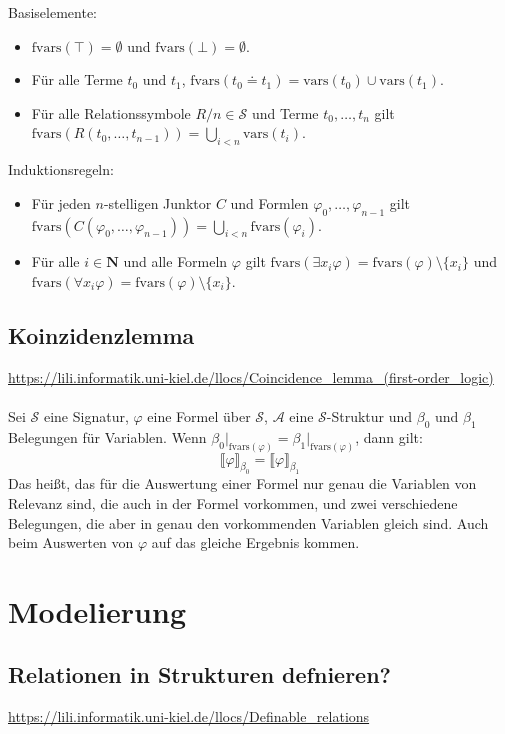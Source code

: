 \documentclass[twocolumn]{article}
\begin{document}
    Basiselemente:
    \begin{itemize}
        \item $\text{fvars}(\top) = \emptyset$ und $\text{fvars}(\bot) = \emptyset$.
        \item Für alle Terme $t_0$ und $t_1$, $\text{fvars}(t_0 \doteq t_1) = \text{vars}(t_0) \cup \text{vars}(t_1)$.
        \item Für alle Relationssymbole $R/n \in \mathcal S$ und Terme $t_0, \dots, t_n$ gilt $\text{fvars}(R(t_0, \dots, t_{n-1})) = \bigcup_{i < n} \text{vars}(t_i)$.
    \end{itemize}
    Induktionsregeln:
    \begin{itemize}
        \item Für jeden $n$-stelligen Junktor $C$ und Formlen $\varphi_0, \dots, \varphi_{n-1}$ gilt $\text{fvars}(C(\varphi_0, \dots, \varphi_{n-1})) = \bigcup_{i < n} \text{fvars}(\varphi_i)$.
        \item Für alle $i \in \mathbf N$ und alle Formeln $\varphi$ gilt $\text{fvars}(\exists x_i \varphi) = \text{fvars}(\varphi) \setminus \{x_i\}$ und $\text{fvars}(\forall x_i \varphi) = \text{fvars}(\varphi) \setminus \{x_i\}$.
    \end{itemize}

    \subsection{Koinzidenzlemma}
    \url{https://lili.informatik.uni-kiel.de/llocs/Coincidence_lemma_(first-order_logic)}\\\\
    Sei $\mathcal S$ eine Signatur, $\varphi$ eine Formel über $\mathcal S$, $\mathcal A$ eine $\mathcal S$-Struktur und $\beta_0$ und $\beta_1$ Belegungen für Variablen. Wenn $\beta_0\vert_{\text{fvars}(\varphi)} = \beta_1\vert_{\text{fvars}(\varphi)}$, dann gilt:
    $$ \llbracket\varphi\rrbracket_{\beta_0} = \llbracket\varphi\rrbracket_{\beta_1}$$
    Das heißt, das für die Auswertung einer Formel nur genau die Variablen von Relevanz sind, die auch in der Formel vorkommen, und zwei verschiedene Belegungen, die aber in genau den vorkommenden Variablen gleich sind. Auch beim Auswerten von $\varphi$ auf das gleiche Ergebnis kommen.

    \section{Modelierung}

    \subsection{Relationen in Strukturen defnieren?}
    \url{https://lili.informatik.uni-kiel.de/llocs/Definable_relations}\\\\
\end{document}
